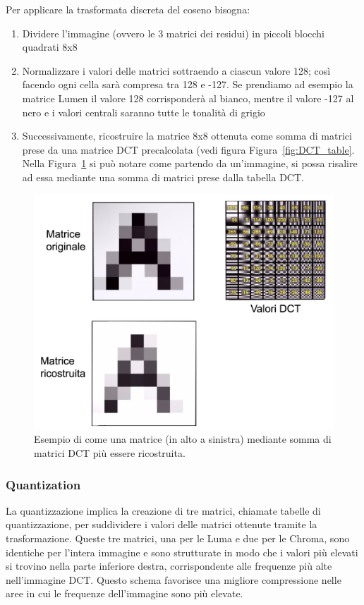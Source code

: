 \documentclass[a4paper,12pt, oneside]{article}
\begin{document}
\noindent Per applicare la trasformata discreta del coseno bisogna:

\begin{enumerate}
    \item Dividere l'immagine (ovvero le 3 matrici dei residui) in piccoli blocchi quadrati 8x8
    \item Normalizzare i valori delle matrici sottraendo a ciascun valore 128; così facendo
    ogni cella sarà compresa tra 128 e -127. Se prendiamo ad esempio la matrice Lumen il valore
    128 corrisponderà al bianco, mentre il valore -127 al nero e i valori centrali saranno tutte
    le tonalità di grigio
    \item Successivamente, ricostruire la matrice 8x8 ottenuta come somma di matrici
    prese da una matrice DCT precalcolata (vedi figura Figura~\ref{fig:DCT_table}. Nella 
    Figura~\ref{fig:DCT_example} si può notare come partendo da un'immagine, si possa
    risalire ad essa mediante una somma di matrici prese dalla tabella DCT.
\end{enumerate}

\begin{figure}[h]
    \centering
    \includegraphics[width=1\textwidth]{images/DCT-example.png}
    \caption{Esempio di come una matrice (in alto a sinistra) mediante somma di matrici DCT
    più essere ricostruita.}
    \label{fig:DCT_example}
\end{figure}

\subsubsection{Quantization}
La quantizzazione implica la creazione di tre matrici, chiamate tabelle di quantizzazione, per
suddividere i valori delle matrici ottenute tramite la trasformazione. Queste tre matrici, una
per le Luma e due per le Chroma, sono identiche per l'intera immagine e sono strutturate in
modo che i valori più elevati si trovino nella parte inferiore destra, corrispondente alle
frequenze più alte nell'immagine DCT. Questo schema favorisce una migliore compressione nelle
aree in cui le frequenze dell'immagine sono più elevate.
\end{document}
